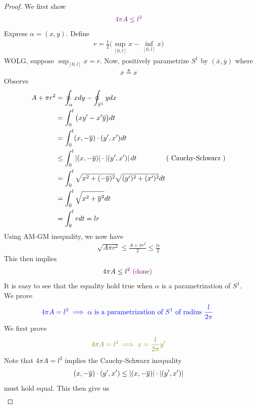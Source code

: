 \documentclass{report}
\begin{document}
\begin{proof}
We first show 
\begin{align*}
\textcolor{violet}{4 \pi A\leq l^2}
\end{align*}
Express $\alpha =(x,y)$. Define 
\begin{align*}
r=\frac{1}{2}\Big(\sup_{[0,l]}x-\inf_{[0,l]}x \Big)
\end{align*}
WOLG, suppose $\sup_{[0,l]}x=r$. Now, positively parametrize $S^1$ by $(\overline{x},\overline{y})$ where
 \begin{align*}
\overline{x}\triangleq x
\end{align*}
Observe 
\begin{align*}
A+\pi r^2&=\oint_\alpha  xdy-\oint_{S^1} ydx\\
&= \int_0^l \big(xy'-x'\overline{y} \big)dt \\
         &=  \int_0^l (x,-\overline{y}) \cdot (y',x') dt\\
         &\leq  \int_0^l \left|(x,-\overline{y})\right|\cdot \left|(y',x')\right|dt\hspace{1.5cm}(\text{ Cauchy-Schwarz })\\
         &= \int_0^l \sqrt{x^2+(-\overline{y})^2} \sqrt{(y')^2 + (x')^2} dt\\
         &= \int_0^l \sqrt{x^2+ \overline{y}^2}dt \\
         &=\int_0^l rdt=lr
\end{align*}
Using AM-GM inequality, we now have 
\begin{align*}
\sqrt{A\pi r^2} \leq \frac{A+\pi r^2}{2}\leq \frac{lr}{2}
\end{align*}
This then implies 
\begin{align*}
4\pi A\leq l^2 \textcolor{violet}{\text{ (done) }}
\end{align*}
It is easy to see that the equality hold true when $\alpha $ is a parametrization of $S^1$. We prove 
\begin{align*}
\textcolor{blue}{4\pi A= l^2 \implies \alpha \text{ is a parametrization of $S^1$ of radius $\frac{l}{2\pi }$ }}
\end{align*}
We first prove 
\begin{align*}
  \olive{4 \pi A=l^2 \implies x=\frac{l}{2\pi}y'}
\end{align*}
Note that $4\pi A=l^2$ implies the Cauchy-Schwarz inequality 
\begin{align*}
  (x,-\overline{y})\cdot (y',x')\leq \left|(x,-\overline{y})\right|\cdot \left|(y',x')\right| 
\end{align*}
must hold equal. This then give us  
\begin{align*}

\end{align*}
\end{proof}
\end{document}
